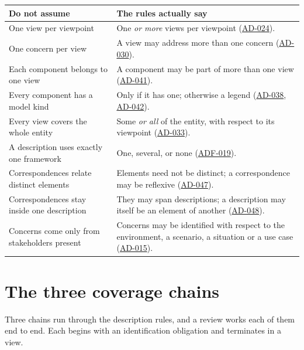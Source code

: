 \documentclass[11pt,a4paper]{report}
\newcommand{\rref}[1]{\hyperref[rule:#1]{\textsf{\small #1}}}
\begin{document}
\begin{center}
\small
\begin{tabular}{@{}L{56mm} L{80mm}@{}}
\toprule
\textbf{Do not assume} & \textbf{The rules actually say} \\
\midrule
One view per viewpoint
  & One \emph{or more} views per viewpoint (\rref{AD-024}). \\
One concern per view
  & A view may address more than one concern (\rref{AD-030}). \\
Each component belongs to one view
  & A component may be part of more than one view (\rref{AD-041}). \\
Every component has a model kind
  & Only if it has one; otherwise a legend (\rref{AD-038},
    \rref{AD-042}). \\
Every view covers the whole entity
  & Some \emph{or all} of the entity, with respect to its viewpoint
    (\rref{AD-033}). \\
A description uses exactly one framework
  & One, several, or none (\rref{ADF-019}). \\
Correspondences relate distinct elements
  & Elements need not be distinct; a correspondence may be reflexive
    (\rref{AD-047}). \\
Correspondences stay inside one description
  & They may span descriptions; a description may itself be an element of another
    (\rref{AD-048}). \\
Concerns come only from stakeholders present
  & Concerns may be identified with respect to the environment, a scenario, a
    situation or a use case (\rref{AD-015}). \\
\bottomrule
\end{tabular}
\end{center}

\section{The three coverage chains}

Three chains run through the description rules, and a review works each of them
end to end. Each begins with an identification obligation and terminates in a
view.
\end{document}
